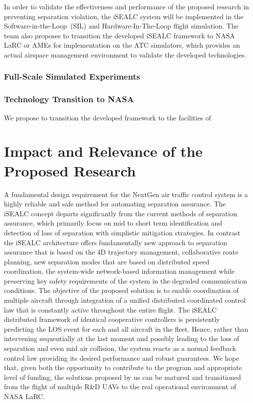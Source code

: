 \documentclass[letter,onecolumn,12pt]{aiaa-tc}
\newcommand{\1}{1_n}
\begin{document}
In order to validate the effectiveness and performance of the proposed research in preventing separation violation, the iSEALC system will be implemented in the Software-in-the-Loop~(SIL) and Hardware-In-The-Loop flight simulation. The team also proposes to transition the developed iSEALC framework to NASA LaRC or AMEs for implementation on the ATC simulators, which provides an actual airspace management environment to validate the developed technologies.


\subsubsection{Full-Scale Simulated Experiments}


\subsubsection{Technology Transition to NASA}

We propose to transition the developed framework to the facilities of




\section{Impact and Relevance of the Proposed Research}
A fundamental design requirement for the NextGen air traffic control system is a highly reliable and safe method for automating separation assurance. The iSEALC concept departs significantly from the current methods of separation assurance, which primarily focus on mid to short term identification and detection of loss of separation with simplistic mitigation strategies. In contrast the iSEALC architecture offers fundamentally new approach to separation assurance that is based on the 4D trajectory management, collaborative route planning, new separation modes that are based on distributed speed coordination, the system-wide network-based information management while preserving key safety requirements of the system in the degraded communication conditions. The objective of the proposed solution is to enable coordination of multiple aircraft through integration of a unified distributed coordinated control law that is constantly active throughout the entire flight. The iSEALC distributed framework of identical cooperative controllers is persistently predicting the LOS event for each and all aircraft in the fleet. Hence, rather than intervening sequentially at the last moment and possibly leading to the loss of separation and even mid air collision, the system reacts as a normal feedback control law providing its desired performance and robust guarantees. We hope that, given both the opportunity to contribute to the program and appropriate level of funding, the solutions proposed by us can be matured and transitioned from the flight of multiple R\&D UAVs to the real operational environment of NASA LaRC.
\end{document}

